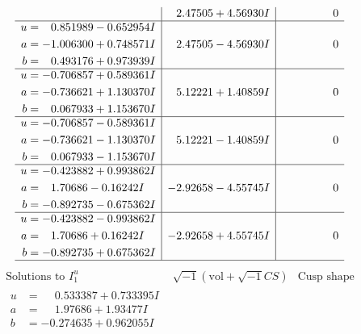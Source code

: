 \documentclass[1p]{elsarticle_modified}
\theoremstyle{definition}
\newcommand{\I}{\sqrt{-1}}
\begin{document}
$$\begin{array}{c|c|c}
 & \phantom{-}2.47505 + 4.56930 I & \phantom{-0.000000 } 0 \\ \hline\begin{aligned}
u &= \phantom{-}0.851989 - 0.652954 I \\
a &= -1.006300 + 0.748571 I \\
b &= \phantom{-}0.493176 + 0.973939 I\end{aligned}
 & \phantom{-}2.47505 - 4.56930 I & \phantom{-0.000000 } 0 \\ \hline\begin{aligned}
u &= -0.706857 + 0.589361 I \\
a &= -0.736621 + 1.130370 I \\
b &= \phantom{-}0.067933 + 1.153670 I\end{aligned}
 & \phantom{-}5.12221 + 1.40859 I & \phantom{-0.000000 } 0 \\ \hline\begin{aligned}
u &= -0.706857 - 0.589361 I \\
a &= -0.736621 - 1.130370 I \\
b &= \phantom{-}0.067933 - 1.153670 I\end{aligned}
 & \phantom{-}5.12221 - 1.40859 I & \phantom{-0.000000 } 0 \\ \hline\begin{aligned}
u &= -0.423882 + 0.993862 I \\
a &= \phantom{-}1.70686 - 0.16242 I \\
b &= -0.892735 - 0.675362 I\end{aligned}
 & -2.92658 - 4.55745 I & \phantom{-0.000000 } 0 \\ \hline\begin{aligned}
u &= -0.423882 - 0.993862 I \\
a &= \phantom{-}1.70686 + 0.16242 I \\
b &= -0.892735 + 0.675362 I\end{aligned}
 & -2.92658 + 4.55745 I & \phantom{-0.000000 } 0\\
 \hline 
 \end{array}$$\newpage$$\begin{array}{c|c|c}  
\text{Solutions to }I^u_{1}& \I (\text{vol} + \sqrt{-1}CS) & \text{Cusp shape}\\
 \hline 
\begin{aligned}
u &= \phantom{-}0.533387 + 0.733395 I \\
a &= \phantom{-}1.97686 + 1.93477 I \\
b &= -0.274635 + 0.962055 I\end{aligned}

\end{array}$$
\end{document}
